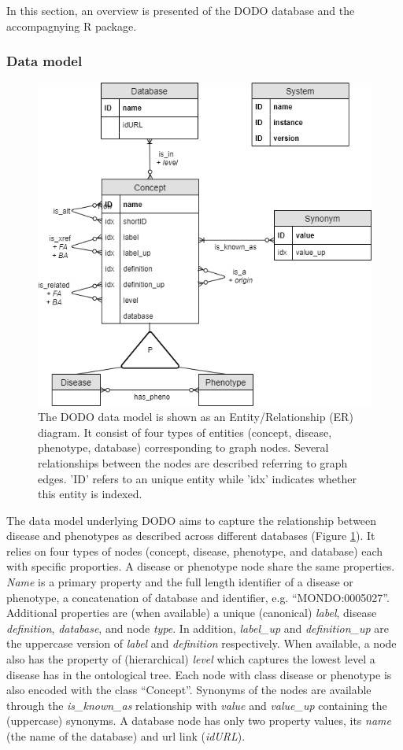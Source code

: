 \documentclass[9pt,a4paper,]{extarticle}
\begin{document}
In this section, an overview is presented of the DODO database and the accompagnying R package.

\hypertarget{data-model}{%
\subsubsection{Data model}\label{data-model}}

\begin{figure}

{\centering \includegraphics[width=0.5\linewidth]{../data-model/DODO} 

}

\caption{The DODO data model is shown as an Entity/Relationship (ER) diagram. It consist of four types of entities (concept, disease, phenotype, database) corresponding to graph nodes. Several relationships between the nodes are described referring to graph edges. 'ID' refers to an unique entity while 'idx' indicates whether this entity is indexed.}\label{fig:dataModel}
\end{figure}

The data model underlying DODO aims to capture the relationship between disease and phenotypes as described across different databases (Figure \ref{fig:dataModel}). It relies on four types of nodes (concept, disease, phenotype, and database) each with specific proporties. A disease or phenotype node share the same properties. \emph{Name} is a primary property and the full length identifier of a disease or phenotype, a concatenation of database and identifier, e.g. ``MONDO:0005027''. Additional properties are (when available) a unique (canonical) \emph{label}, disease \emph{definition}, \emph{database}, and node \emph{type}. In addition, \emph{label\_up} and \emph{definition\_up} are the uppercase version of \emph{label} and \emph{definition} respectively. When available, a node also has the property of (hierarchical) \emph{level} which captures the lowest level a disease has in the ontological tree. Each node with class disease or phenotype is also encoded with the class ``Concept''. Synonyms of the nodes are available through the \emph{is\_known\_as} relationship with \emph{value} and \emph{value\_up} containing the (uppercase) synonyms. A database node has only two property values, its \emph{name} (the name of the database) and url link (\emph{idURL}).
\end{document}
